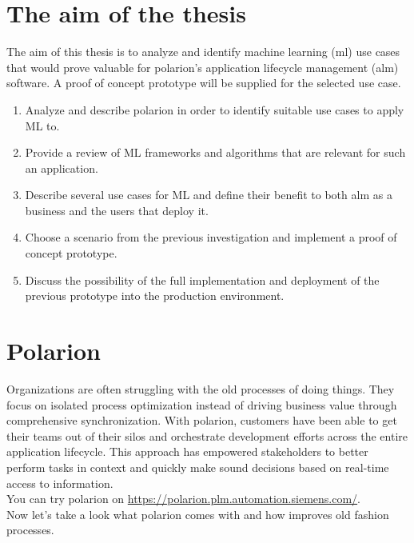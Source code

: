 \documentclass[thesis=M,english]{FITthesis}[2012/06/26]
\begin{document}
\chapter{The aim of the thesis}

The aim of this thesis is to analyze and identify machine learning (\acrshort{ml}) use cases that would prove valuable for \acrshort{polarion}’s application lifecycle management (\acrshort{alm}) software. A proof of concept prototype will be supplied for the selected use case.

\begin{enumerate}[nosep]
	\item Analyze and describe \acrshort{polarion} in order to identify suitable use cases to apply ML to. 
	\item Provide a review of ML frameworks and algorithms that are relevant for such an application.
	\item Describe several use cases for ML and define their benefit to both \acrshort{alm} as a business and the users that deploy it.
	\item Choose a scenario from the previous investigation and implement a proof of concept prototype.
	\item Discuss the possibility of the full implementation and deployment of the previous prototype into the production environment.
\end{enumerate}

\chapter{Polarion}

Organizations are often struggling with the old processes of doing things. They focus on isolated process optimization instead of driving
business value through comprehensive synchronization. With \acrshort{polarion}, customers have been able to get their teams out of their silos and orchestrate development efforts across the entire application lifecycle. This approach has empowered stakeholders to better perform tasks in context and quickly make sound decisions based on real-time access to information.\\

You can try \acrshort{polarion} on \url{https://polarion.plm.automation.siemens.com/}.\\

Now let's take a look what \acrshort{polarion} comes with and how improves old fashion processes.
\end{document}
